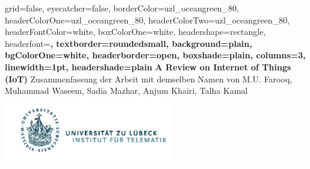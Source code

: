 \documentclass[a0paper,portrait]{baposter}
\begin{document}



\background{
}

\begin{poster}{
	grid=false,
	eyecatcher=false, 
	borderColor=uzl_oceangreen_80,
	headerColorOne=uzl_oceangreen_80,
	headerColorTwo=uzl_oceangreen_80,
	headerFontColor=white,
	boxColorOne=white,
	headershape=rectangle,
	headerfont=\large\bf,
	textborder=roundedsmall,
	background=plain,
	bgColorOne=white,
	headerborder=open,
	boxshade=plain,
	columns=3,
	linewidth=1pt,
	headershade=plain
}
{
}
{
	\vspace{0.3cm}
  \textcolor{uzl_oceangreen_80}{\textbf{A Review on Internet of Things (IoT)}}
    \vspace{0.3cm}
}
{
  \textcolor{uzl_orange_2}{\textsf{Zusammenfassung der Arbeit mit demselben Namen von M.U. Farooq, Muhammad Waseem, Sadia Mazhar, Anjum Khairi, Talha Kamal \cite{AReViewOnInternetOfThings}}}
}
{
  \hspace{1cm}
  \includegraphics[height=8em]{Logo_Inst_Telematik_orig}
}


\end{poster}
\end{document}
